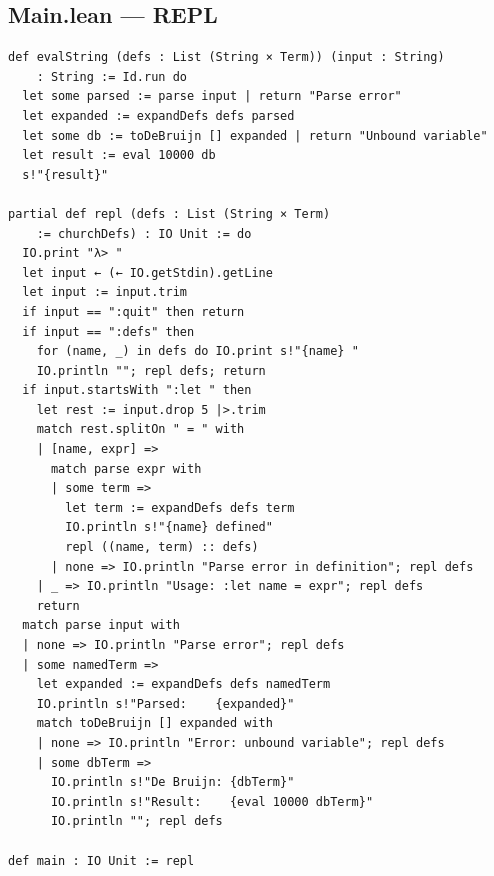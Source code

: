 \documentclass[11pt,a4paper]{article}
\theoremstyle{definition}
\begin{document}
\subsection*{Main.lean --- REPL}

\begin{verbatim}
def evalString (defs : List (String × Term)) (input : String)
    : String := Id.run do
  let some parsed := parse input | return "Parse error"
  let expanded := expandDefs defs parsed
  let some db := toDeBruijn [] expanded | return "Unbound variable"
  let result := eval 10000 db
  s!"{result}"

partial def repl (defs : List (String × Term)
    := churchDefs) : IO Unit := do
  IO.print "λ> "
  let input ← (← IO.getStdin).getLine
  let input := input.trim
  if input == ":quit" then return
  if input == ":defs" then
    for (name, _) in defs do IO.print s!"{name} "
    IO.println ""; repl defs; return
  if input.startsWith ":let " then
    let rest := input.drop 5 |>.trim
    match rest.splitOn " = " with
    | [name, expr] =>
      match parse expr with
      | some term =>
        let term := expandDefs defs term
        IO.println s!"{name} defined"
        repl ((name, term) :: defs)
      | none => IO.println "Parse error in definition"; repl defs
    | _ => IO.println "Usage: :let name = expr"; repl defs
    return
  match parse input with
  | none => IO.println "Parse error"; repl defs
  | some namedTerm =>
    let expanded := expandDefs defs namedTerm
    IO.println s!"Parsed:    {expanded}"
    match toDeBruijn [] expanded with
    | none => IO.println "Error: unbound variable"; repl defs
    | some dbTerm =>
      IO.println s!"De Bruijn: {dbTerm}"
      IO.println s!"Result:    {eval 10000 dbTerm}"
      IO.println ""; repl defs

def main : IO Unit := repl
\end{verbatim}
\end{document}
